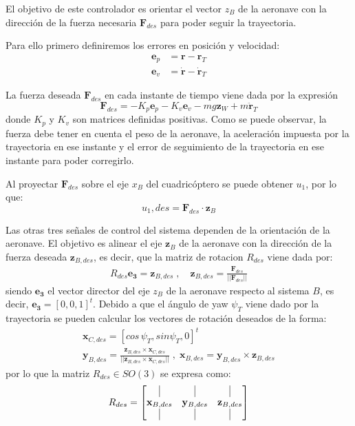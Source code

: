 El objetivo de este controlador es orientar el vector $z_B$ de la aeronave con la dirección de la fuerza necesaria $\mathbf{F}_{des}$ para poder seguir la trayectoria.


Para ello primero definiremos los errores en posición y velocidad:
\begin{align}
	\mathbf{e}_p &= \mathbf{r} -\mathbf{r}_T\\
	\mathbf{e}_v &= \mathbf{\dot r} -\mathbf{\dot r}_T
\end{align} 

La fuerza deseada $\mathbf{F}_{des}$ en cada instante de tiempo viene dada por la expresión
\begin{equation}
	\mathbf{F}_{des} = -K_p	\mathbf{e}_p - K_v	\mathbf{e}_v - mg	\mathbf{z}_W + m	\mathbf{\ddot r}_T
\end{equation}
donde $K_p$ y $K_v$ son matrices definidas positivas.
Como se puede observar, la fuerza debe tener en cuenta el peso de la aeronave, la aceleración impuesta por la trayectoria en ese instante y el error de seguimiento de la trayectoria en ese instante para poder corregirlo.

Al proyectar $\mathbf{F}_{des}$ sobre el eje $x_B$ del cuadricóptero se puede obtener $u_1$, por lo que:
\begin{equation}
	u_1,des = \mathbf{F}_{des}\cdot \mathbf{z}_B
\end{equation}

Las otras tres señales de control del sistema dependen de la orientación de la aeronave. El objetivo es alinear el eje $\mathbf{z}_B$ de la aeronave con la dirección de la fuerza deseada $\mathbf{z}_{B,des}$, es decir, que la matriz de rotacion $R_{des}$ viene dada por:
\begin{align}	
	R_{des}\mathbf{e_3} = \mathbf{z}_{B,des}\;,\quad 
\mathbf{z}_{B,des} = \frac{\mathbf{F}_{des}}{||\mathbf{F}_{des}||}
\end{align}
siendo $\mathbf{e_3}$ el vector director del eje $z_B$ de la aeronave respecto al sistema $B$, es decir, $\mathbf{e_3} = [0, 0, 1]^t$.
Debido a que el ángulo de yaw $\psi_T$ viene dado por la trayectoria se pueden calcular los vectores de rotación deseados de la forma:
\begin{gather}
	\mathbf{x}_{C,des} = [cos\, \psi_T , sin \psi_T, 0]^t\\
	\mathbf{y}_{B,des} = \frac{\mathbf{z}_{B,des}\times\mathbf{x}_{C,des}}{||\mathbf{z}_{B,des}\times\mathbf{x}_{C,des}||}\;,\; \mathbf{x}_{B,des} = \mathbf{y}_{B,des} \times\mathbf{z}_{B,des}
\end{gather}
por lo que la matriz $R_{des} \in SO(3)$ se expresa como:
\begin{equation}
	R_{des}=
	\begin{bmatrix}
		\vrule&\vrule&\vrule\\
		\mathbf{x}_{B,des}&\mathbf{y}_{B,des}&\mathbf{z}_{B,des}\\
		\vrule&\vrule&\vrule
	\end{bmatrix}
\end{equation}

